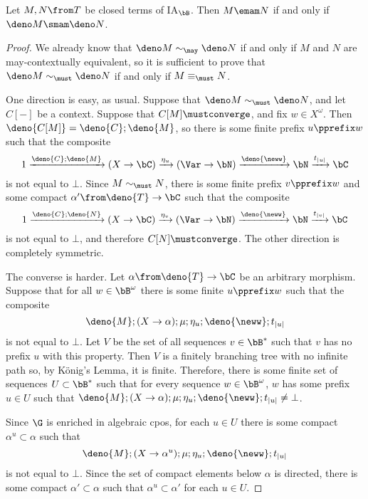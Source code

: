 \begin{theorem}
  Let $M,N\from T$ be closed terms of IA${}_{\bB}$.
  Then $M\emam N$ if and only if $\deno M\smam \deno N$.
  \label{FullAbstractionFiniteNondeterminism}
\end{theorem}
\begin{proof}
  We already know that $\deno M\sim_{\may}\deno N$ if and only if $M$ and $N$ are may-contextually equivalent, so it is sufficient to prove that $\deno M\sim_{\must}\deno N$ if and only if $M\equiv_{\must}N$.

  One direction is easy, as usual.  
  Suppose that $\deno M\sim_{\must} \deno N$, and let $C[-]$ be a context.  
  Suppose that $C[M]\mustconverge$, and fix $w\in X^\omega$.
  Then $\deno{C[M]} = \deno{C};\deno{M}$, so there is some finite prefix $u\pprefix w$ such that the composite
  \[
    1 \xrightarrow{\deno{C};\deno{M}}
    (X \to \bC) \xrightarrow{\eta_u}
    (\Var \to \bN) \xrightarrow{\deno{\neww}}
    \bN \xrightarrow{t_{|u|}}
    \bC
    \]
  is not equal to $\bot$.  
  Since $M\sim_{\must} N$, there is some finite prefix $v\pprefix w$ and some compact $\alpha'\from \deno{T}\to\bC$ such that the composite
  \[
    1 \xrightarrow{\deno{C};\deno{N}}
    (X \to \bC) \xrightarrow{\eta_v}
    (\Var \to \bN) \xrightarrow{\deno{\neww}}
    \bN \xrightarrow{t_{|v|}}
    \bC
    \]
  is not equal to $\bot$, and therefore $C[N]\mustconverge$.  
  The other direction is completely symmetric.

  The converse is harder.  
  Let $\alpha \from \deno{T} \to \bC$ be an arbitrary morphism.
  Suppose that for all $w\in \bB^\omega$ there is some finite $u\pprefix w$ such that the composite
  \[
    \deno{M};(X \to \alpha);\mu;\eta_u;\deno{\neww};t_{|u|}
    \]
  is not equal to $\bot$.  
  Let $V$ be the set of all sequences $v\in \bB^*$ such that $v$ has no prefix $u$ with this property.  
  Then $V$ is a finitely branching tree with no infinite path so, by K\"{o}nig's Lemma, it is finite.  
  Therefore, there is some finite set of sequences $U\subset \bB^*$ such that for every sequence $w\in \bB^\omega$, $w$ has some prefix $u\in U$ such that $\deno{M};(X \to \alpha);\mu;\eta_u;\deno{\neww};t_{|u|}\ne\bot$.

  Since $\G$ is enriched in algebraic cpos, for each $u\in U$ there is some compact $\alpha^u\subset\alpha$ such that
  \[
    \deno{M};(X \to \alpha^u);\mu;\eta_u;\deno{\neww};t_{|u|}
    \]
  is not equal to $\bot$.  
  Since the set of compact elements below $\alpha$ is directed, there is some compact $\alpha'\subset\alpha$ such that $\alpha^u\subset\alpha'$ for each $u\in U$.  


\end{proof}
